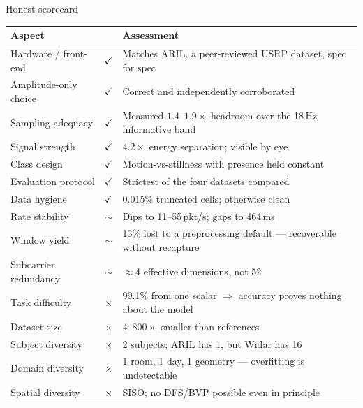 \documentclass[aspectratio=169,10pt]{beamer}
\newcommand{\yes}{\textcolor{good}{$\checkmark$}}
\newcommand{\may}{\textcolor{warn}{$\sim$}}
\newcommand{\no}{\textcolor{bad}{$\times$}}
\begin{document}
\begin{frame}{Honest scorecard}
\centering
\begin{table}\scriptsize
\begin{tabular}{@{}p{} c p{}@{}}
\toprule
\textbf{Aspect} & & \textbf{Assessment}\\
\midrule
Hardware / front-end & \yes & Matches ARIL, a peer-reviewed USRP dataset, spec for spec\\
Amplitude-only choice & \yes & Correct and independently corroborated\\
Sampling adequacy & \yes & Measured $1.4$--$1.9\times$ headroom over the 18\,Hz informative band\\
Signal strength & \yes & $4.2\times$ energy separation; visible by eye\\
Class design & \yes & Motion-vs-stillness with presence held constant\\
Evaluation protocol & \yes & Strictest of the four datasets compared\\
Data hygiene & \yes & 0.015\% truncated cells; otherwise clean\\
\midrule
Rate stability & \may & Dips to 11--55\,pkt/s; gaps to 464\,ms\\
Window yield & \may & 13\% lost to a preprocessing default --- recoverable without recapture\\
Subcarrier redundancy & \may & $\approx$4 effective dimensions, not 52\\
\midrule
Task difficulty & \no & 99.1\% from one scalar $\Rightarrow$ accuracy proves nothing about the model\\
Dataset size & \no & $4$--$800\times$ smaller than references\\
Subject diversity & \no & 2 subjects; ARIL has 1, but Widar has 16\\
Domain diversity & \no & 1 room, 1 day, 1 geometry --- overfitting is undetectable\\
Spatial diversity & \no & SISO; no DFS/BVP possible even in principle\\
\bottomrule
\end{tabular}
\end{table}
\end{frame}
\end{document}
